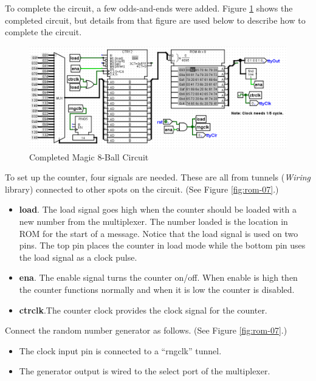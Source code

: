 To complete the circuit, a few odds-and-ends were added. Figure \ref{fig:rom-06} shows the completed circuit, but details from that figure are used below to describe how to complete the circuit.

\begin{figure}[H]
	\centering
	\includegraphics[width=\maxwidth{.95\linewidth}]{gfx/rom-06}
	\caption{Completed Magic 8-Ball Circuit}
	\label{fig:rom-06}
\end{figure}

To set up the counter, four signals are needed. These are all from tunnels (\textit{Wiring} library) connected to other spots on the circuit. (See Figure \ref{fig:rom-07}.)

\begin{itemize}
	\item \textbf{load}. The load signal goes high when the counter should be loaded with a new number from the multiplexer. The number loaded is the location in ROM for the start of a message. Notice that the load signal is used on two pins. The top pin places the counter in load mode while the bottom pin uses the load signal as a clock pulse.
	\item \textbf{ena}. The enable signal turns the counter on/off. When enable is high then the counter functions normally and when it is low the counter is disabled.
	\item \textbf{ctrclk}.The counter clock provides the clock signal for the counter.
\end{itemize}

Connect the random number generator as follows. (See Figure \ref{fig:rom-07}.)

\begin{itemize}
	\item The clock input pin is connected to a ``rngclk'' tunnel.
	\item The generator output is wired to the select port of the multiplexer.
\end{itemize}


